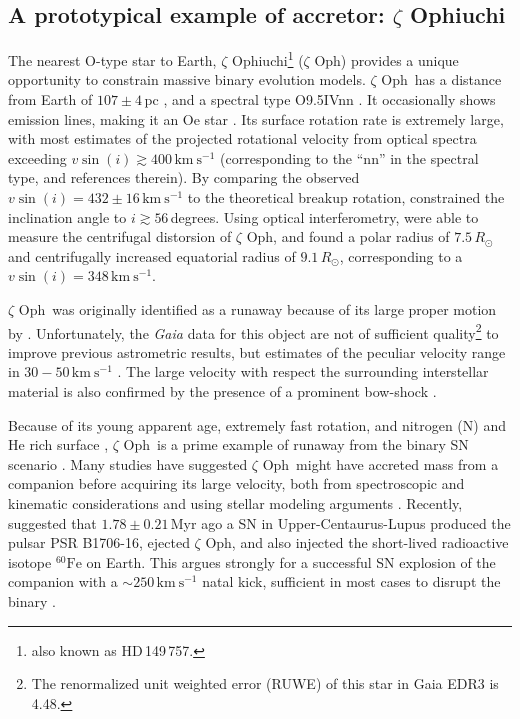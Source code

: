 \documentclass[twocolumn,twocolappendix,trackchanges]{aastex63}
\newcommand{\kms}{{\mathrm{km\ s^{-1}}}}
\newcommand{\zoph}{$\zeta$ Oph}
\begin{document}
\subsection{A prototypical example of accretor: $\zeta$ Ophiuchi}

The nearest O-type star to Earth, $\zeta$
Ophiuchi\footnote{also known as HD\,149\,757.} (\zoph) provides a
unique opportunity to constrain massive binary evolution models.  \zoph\ has a distance
from Earth of $107\pm4$\,pc \citep[][and references
therein]{neuhauser:20}, and a spectral type O9.5{\rm IVnn}
\citep{sota:14}. It occasionally shows emission lines, making it an Oe
star \citep{walker:79, vink:09}. Its surface rotation rate is
extremely large, with most estimates of the projected rotational
velocity from optical spectra exceeding $v\sin(i)\gtrsim 400\,\kms$
(corresponding to the ``nn'' in the spectral type, \citealt{zehe:18}
and references therein). By comparing the
observed $v\sin(i)=432\pm16\,\kms$ to the theoretical breakup
rotation, \cite{zehe:18} constrained the inclination angle to
$i\gtrsim 56$\,degrees. Using optical interferometry, \cite{gordon:18}
were able to measure the centrifugal distorsion of \zoph, and found a
polar radius of $7.5\,R_\odot$ and centrifugally increased equatorial
radius of $9.1\,R_\odot$, corresponding to a $v\sin(i)=348\,\kms$.

\zoph\ was originally
identified as a runaway because of its large proper motion by
\cite{blaauw:52}. Unfortunately, the \emph{Gaia} data for this object
are not of sufficient quality\footnote{The renormalized unit weighted
  error (RUWE) of this star in Gaia EDR3 is 4.48.} to improve previous astrometric results,
but estimates of the peculiar velocity range in $30-50\,\kms$
\citep[e.g.,][]{zehe:18, neuhauser:20}. The large velocity with
respect the surrounding interstellar material is also confirmed by the
presence of a prominent bow-shock \citep[e.g.,][]{bodensteiner:18}.

Because of its young apparent age, extremely fast rotation, and nitrogen
(N) and He rich surface \citep[e.g.,][]{herrero:92, blaauw:93,
  villamariz:05, marcolino:09}, \zoph\ is a prime example of runaway from the binary SN scenario \citep{blaauw:93}. Many studies have suggested
\zoph\ might have accreted mass from a companion before acquiring its
large velocity, both from spectroscopic and kinematic considerations
\citep[e.g.,][]{blaauw:93, hoogerwerf:00, hoogerwerf:01, tetzlaff:10,
  neuhauser:20} and using stellar modeling arguments
\citep[e.g.,][]{vanrensbergen:96}. Recently, \cite{neuhauser:20}
suggested that $1.78\pm0.21$\,Myr ago a SN in
Upper-Centaurus-Lupus produced the pulsar PSR B1706-16, ejected \zoph,
and also injected the short-lived radioactive isotope
$^{60}\mathrm{Fe}$ on Earth. This argues strongly for a successful
SN explosion of the companion with a $\sim 250\,\kms$ natal
kick, sufficient in most cases to disrupt the binary
\citep[e.g.,][]{tauris:15, renzo:19walk, evans:20}.
\end{document}
